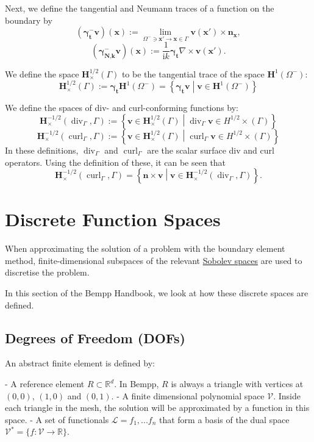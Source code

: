 \documentclass[a4paper]{book}
\begin{document}
Next, we define the tangential and Neumann traces of a function on the boundary by
\[(\mathbf{\gamma}^-_\textbf{t}\mathbf{v})(\mathbf{x}):=\lim_{\Omega^-\ni \mathbf{x}'\to \mathbf{x}\in\Gamma}\mathbf{v}(\mathbf{x}')\times\mathbf{n}_\mathbf{x},\]
\[(\mathbf{\gamma}^-_\textbf{N,k}\mathbf{v})(\mathbf{x}):=\frac1{\mathrm{i}k}\mathbf{\gamma}_\textbf{t}\nabla\times\mathbf{v}(\mathbf{x'}).\]

We define the space $\mathbf{H}^{1/2}_\times(\Gamma)$ to be the tangential trace of the space $\mathbf{H}^1(\Omega^-)$:
\[\mathbf{H}^{1/2}_\times(\Gamma):=\mathbf\gamma_\textbf{t}\mathbf{H}^1(\Omega^-)=\left\{\mathbf\gamma_\textbf{t}\mathbf{v}\middle|\mathbf{v}\in \mathbf{H}^1(\Omega^-)\right\}\]

We define the spaces of div- and curl-conforming functions by:
\[\mathbf{H}^{-1/2}_\times(\operatorname{div}_\Gamma,\Gamma):=\left\{\mathbf{v}\in\mathbf{H}^{1/2}_\times(\Gamma)\middle|\operatorname{div}_\Gamma\mathbf{v}\in H^{1/2}\times(\Gamma)\right\}\]
\[\mathbf{H}^{-1/2}_\times(\operatorname{curl}_\Gamma,\Gamma):=\left\{\mathbf{v}\in\mathbf{H}^{1/2}_\times(\Gamma)\middle|\operatorname{curl}_\Gamma\mathbf{v}\in H^{1/2}\times(\Gamma)\right\}\]
In these definitions, $\operatorname{div}_\Gamma$
and $\operatorname{curl}_\Gamma$ are the scalar
surface div and curl operators. Using the definition of these, it can be seen that
\[\mathbf{H}^{-1/2}_\times(\operatorname{curl}_\Gamma,\Gamma)=\left\{\mathbf{n}\times\mathbf{v}\middle|\mathbf{v}\in\mathbf{H}^{-1/2}_\times(\operatorname{div}_\Gamma,\Gamma)\right\}.\]


\section{Discrete Function Spaces}


When approximating the solution of a problem with the boundary element method, finite-dimensional
subspaces of the relevant \href{sobolev_spaces.md}{Sobolev spaces} are used to discretise the problem.

In this section of the Bempp Handbook, we look at how these discrete spaces are defined.


\subsection{Degrees of Freedom (DOFs)}


An abstract finite element is defined by:

- A reference element $R\subset\mathbb{R}^d$. In Bempp, $R$ is always a triangle with vertices at
  $(0,0)$, $(1,0)$ and $(0,1)$.
- A finite dimensional polynomial space $\mathcal{V}$. Inside each triangle in the mesh, the solution
  will be approximated by a function in this space.
- A set of functionals $\mathcal{L}={f_1, ... f_n}$ that form a basis of the dual space
  $\mathcal{V}^*=\{f:\mathcal{V}\to\mathbb{R}\}$.
\end{document}
